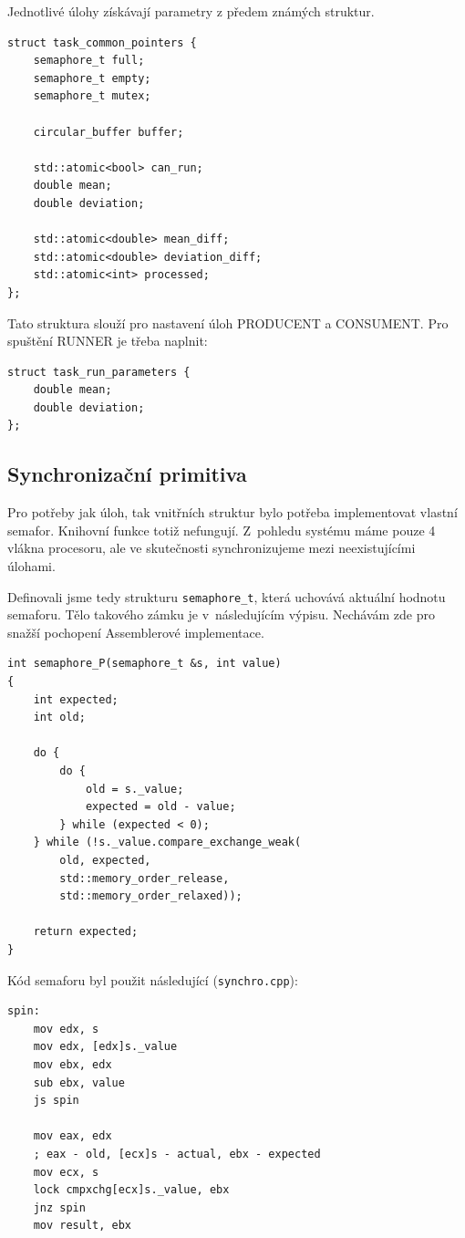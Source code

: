 \documentclass[a4paper,12pt]{article}
\begin{document}
Jednotlivé úlohy získávají parametry z předem známých struktur.

\newpage

\begin{lstlisting}
struct task_common_pointers {
	semaphore_t full;
	semaphore_t empty;
	semaphore_t mutex;

	circular_buffer buffer;

	std::atomic<bool> can_run;
	double mean;
	double deviation;

	std::atomic<double> mean_diff;
	std::atomic<double> deviation_diff;
	std::atomic<int> processed;
};
\end{lstlisting}

Tato struktura slouží pro nastavení úloh PRODUCENT a CONSUMENT. Pro spuštění
RUNNER je třeba naplnit:

\begin{lstlisting}
struct task_run_parameters {
	double mean;
	double deviation;
};
\end{lstlisting}

\subsection{Synchronizační primitiva}
Pro potřeby jak úloh, tak vnitřních struktur bylo potřeba implementovat vlastní
semafor. Knihovní funkce totiž nefungují. Z~pohledu systému máme pouze 4 vlákna
procesoru, ale ve skutečnosti synchronizujeme mezi neexistujícími úlohami.

Definovali jsme tedy strukturu \texttt{semaphore\_t}, která uchovává aktuální hodnotu
semaforu. Tělo takového zámku je v~následujícím výpisu. Nechávám zde pro snažší
pochopení Assemblerové implementace.

\begin{lstlisting}
int semaphore_P(semaphore_t &s, int value)
{
	int expected;
	int old;

	do {
		do {
			old = s._value;
			expected = old - value;
		} while (expected < 0);
	} while (!s._value.compare_exchange_weak(
		old, expected,
		std::memory_order_release,
		std::memory_order_relaxed));

	return expected;
}
\end{lstlisting}

Kód semaforu byl použit následující (\texttt{synchro.cpp}):


\begin{lstlisting}
spin:
	mov edx, s
	mov edx, [edx]s._value
	mov ebx, edx
	sub ebx, value
	js spin

	mov eax, edx
	; eax - old, [ecx]s - actual, ebx - expected
	mov ecx, s
	lock cmpxchg[ecx]s._value, ebx
	jnz spin
	mov result, ebx
\end{lstlisting}
\end{document}
